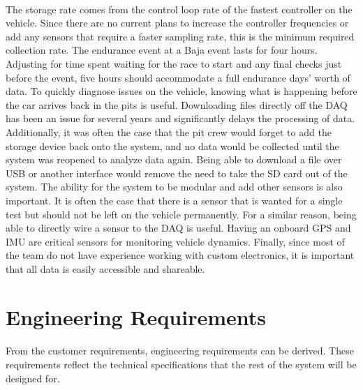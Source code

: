 \paragraph{}
The storage rate comes from the control loop rate of the fastest controller on the vehicle.
Since there are no current plans to increase the controller frequencies or add any sensors that require a faster sampling rate, this is the minimum required collection rate.
The endurance event at a Baja event lasts for four hours.
Adjusting for time spent waiting for the race to start and any final checks just before the event, five hours should accommodate a full endurance days' worth of data.
To quickly diagnose issues on the vehicle, knowing what is happening before the car arrives back in the pits is useful.
Downloading files directly off the DAQ has been an issue for several years and significantly delays the processing of data.
Additionally, it was often the case that the pit crew would forget to add the storage device back onto the system, and no data would be collected until the system was reopened to analyze data again.
Being able to download a file over USB or another interface would remove the need to take the SD card out of the system.
The ability for the system to be modular and add other sensors is also important.
It is often the case that there is a sensor that is wanted for a single test but should not be left on the vehicle permanently.
For a similar reason, being able to directly wire a sensor to the DAQ is useful.
Having an onboard GPS and IMU are critical sensors for monitoring vehicle dynamics.
Finally, since most of the team do not have experience working with custom electronics, it is important that all data is easily accessible and shareable.

\section{Engineering Requirements}

\paragraph{}
From the customer requirements, engineering requirements can be derived.
These requirements reflect the technical specifications that the rest of the system will be designed for.

